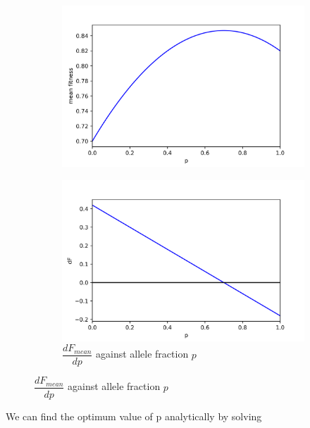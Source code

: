 \documentclass{article}
\begin{document}
\begin{figure}[h]
	\centering
	\begin{subfigure}[t]{0.43\linewidth}
		\centering
		\includegraphics[width = 1.0\linewidth, trim={0 0 0 0}, clip=true]{fitness.png}
		\label{fig:F}	
	\end{subfigure}
	\hspace{0.1\linewidth}
	\begin{subfigure}[t]{0.43\linewidth}
		\centering
		\includegraphics[width = 1.0\linewidth, trim={0 0 0 0}, clip=true]{dfitness.png}
		\caption{$\dfrac{dF_{mean}}{dp}$ against allele fraction $p$}
		\label{fig:dF}
	\end{subfigure}
\label{fig:fit}
\end{figure}

We can find the optimum value of p analytically by solving
\end{document}
